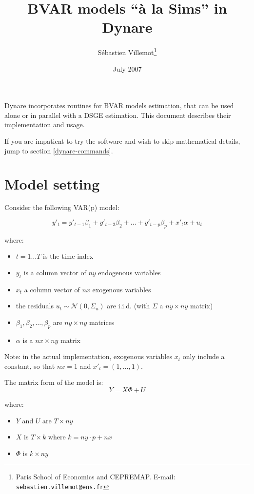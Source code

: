 \documentclass[10pt,a4paper]{article}
\begin{document}
\title{BVAR models ``\`a la Sims'' in Dynare}
\author{S\'ebastien Villemot\thanks{Paris School of Economics and CEPREMAP. E-mail: \texttt{sebastien.villemot@ens.fr}}}
\date{July 2007}

\maketitle

Dynare incorporates routines for BVAR models estimation, that can be used alone or in parallel with a DSGE estimation.
This document describes their implementation and usage.

If you are impatient to try the software and wish to skip mathematical details, jump to section \ref{dynare-commands}.

\section{Model setting}

Consider the following VAR(p) model:

$$y'_t = y'_{t-1}\beta_1 + y'_{t-2}\beta_2 + \ldots + y'_{t-p}\beta_p + x'_t\alpha + u_t$$

where:
\begin{itemize}
\item $t = 1\ldots T$ is the time index
\item $y_t$ is a column vector of $ny$ endogenous variables
\item $x_t$ a column vector of $nx$ exogenous variables
\item the residuals $u_t \sim \mathcal{N}(0, \Sigma_u)$ are i.i.d. (with $\Sigma$ a $ny\times ny$ matrix)
\item $\beta_1,\beta_2,\ldots,\beta_p$ are $ny\times ny$ matrices
\item $\alpha$ is a $nx\times ny$ matrix
\end{itemize}

Note: in the actual implementation, exogenous variables $x_t$ only include a constant, so that $nx = 1$ and $x'_t = (1, \ldots, 1)$.

The matrix form of the model is:
$$Y = X\Phi + U$$

where:
\begin{itemize}
\item $Y$ and $U$ are $T\times ny$
\item $X$ is $T\times k$ where $k = ny\cdot p + nx$
\item $\Phi$ is $k \times ny$
\end{itemize}
\end{document}
